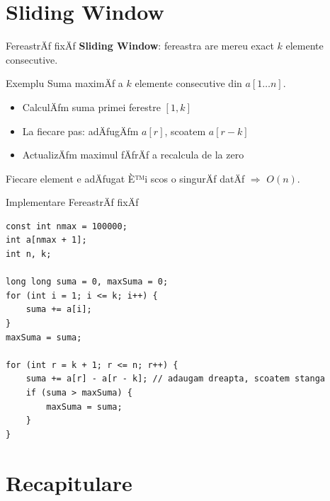 ﻿\documentclass{beamer}
\begin{document}
\section{Sliding Window}

\begin{frame}{FereastrÄƒ fixÄƒ}
  \textbf{Sliding Window}: fereastra are mereu exact $k$ elemente consecutive.

  \begin{block}{Exemplu}
    Suma maximÄƒ a $k$ elemente consecutive din $a[1 \ldots n]$.
  \end{block}

  \begin{itemize}
    \item CalculÄƒm suma primei ferestre $[1, k]$
    \item La fiecare pas: adÄƒugÄƒm $a[r]$, scoatem $a[r-k]$
    \item ActualizÄƒm maximul \textemdash{} fÄƒrÄƒ a recalcula de la zero
  \end{itemize}

  \smallskip
  Fiecare element e adÄƒugat È™i scos o singurÄƒ datÄƒ $\Rightarrow$ $O(n)$.
\end{frame}

\begin{frame}{Implementare \textemdash{} FereastrÄƒ fixÄƒ}
  \begin{lstlisting}
const int nmax = 100000;
int a[nmax + 1];
int n, k;

long long suma = 0, maxSuma = 0;
for (int i = 1; i <= k; i++) {
    suma += a[i];
}
maxSuma = suma;

for (int r = k + 1; r <= n; r++) {
    suma += a[r] - a[r - k]; // adaugam dreapta, scoatem stanga
    if (suma > maxSuma) {
        maxSuma = suma;
    }
}
  \end{lstlisting}
\end{frame}

\section{Recapitulare}
\end{document}
